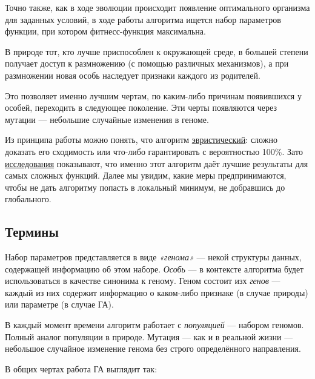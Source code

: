\documentclass[11pt]{article}
\begin{document}
    Точно также, как в ходе эволюции происходит появление оптимального организма для заданных условий,
    в ходе работы алгоритма ищется набор параметров функции, при котором фитнесс-функция максимальна.

    В природе тот, кто лучше приспособлен к окружающей среде, в большей степени получает доступ к размножению (с помощью различных механизмов),
    а при размножении новая особь наследует признаки каждого из родителей.

    Это позволяет именно лучшим чертам, по каким-либо причинам появившихся у особей, переходить в следующее поколение.
    Эти черты появляются через мутации — небольшие случайные изменения в геноме.

    Из принципа работы можно понять, что алгоритм \href{https://en.wikipedia.org/wiki/Heuristic_(computer_science)}{эвристический}: сложно доказать его сходимость или что-либо гарантировать с вероятностью 100\%.
    Зато \href{talgat.org/news/wp-content/uploads/2018/08/112.pdf}{исследования} показывают, что именно этот алгоритм даёт лучшие результаты для самых сложных функций.
    Далее мы увидим, какие меры предпринимаются, чтобы не дать алгоритму попасть в локальный минимум, не добравшись до глобального.

    \subsection{Термины}\label{subsec:ga_principles}
    Набор параметров представляется в виде \textit{«генома»} — некой структуры данных, содержащей информацию об этом наборе.
    \textit{Особь} — в контексте алгоритма будет использоваться в качестве синонима к геному.
    Геном состоит изх \textit{генов} — каждый из них содержит информацию о каком-либо признаке (в случае природы) или параметре (в случае ГА).

    В каждый момент времени алгоритм работает с \textit{популяцией} — набором геномов. Полный аналог популяции в природе.
    Мутация — как и в реальной жизни — небольшое случайное изменение генома без строго определённого направления.

    В общих чертах работа ГА выглядит так:
\end{document}
